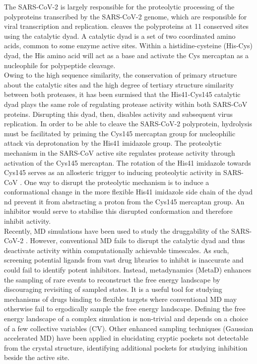 The SARS-CoV-2  is largely responsible for the proteolytic processing of the polyproteins transcribed by the SARS-CoV-2 genome, which are responsible for viral transcription and replication.  cleaves the polyproteins at 11 conserved sites using the catalytic dyad.\cite{hegyi2002conservation, jin2020structure} A catalytic dyad is a set of two coordinated amino acids, common to some enzyme active sites. Within a histidine-cysteine (His-Cys) dyad, the His amino acid will act as a base and activate the Cys mercaptan as a nucleophile for polypeptide cleavage. \\

Owing to the high sequence similarity, the conservation of primary structure about the catalytic sites and the high degree of tertiary structure similarity between both proteases, it has been surmised that the His41-Cys145 catalytic dyad plays the same role of regulating protease activity within both SARS-CoV  proteins.\cite{jin2020structure, ullrich2020sars} Disrupting this dyad, then, disables  activity and subsequent virus replication. In order to be able to cleave the SARS-CoV-2 polyprotein, hydrolysis must be facilitated by priming the  Cys145 mercaptan group for nucleophilic attack via deprotonation by the His41 imidazole group. The proteolytic mechanism in the SARS-CoV  active site regulates protease activity through activation of the Cys145 mercaptan. The rotation of the His41 imidazole towards Cys145 serves as an allosteric trigger to inducing proteolytic activity in SARS-CoV . One way to disrupt the proteolytic mechanism is to induce a conformational change in the more flexible His41 imidazole side chain of the dyad nd prevent it from abstracting a proton from the Cys145 mercaptan group. An inhibitor would serve to stabilise this disrupted conformation and therefore inhibit  activity.\\

Recently, MD simulations have been used to study the druggability of the SARS-CoV-2 \!\!.\cite{macchiagodena2020identification, ghahremanpour2020identification} However, conventional MD fails to disrupt the  catalytic dyad and thus deactivate  activity within computationally achievable timescales. As such, screening potential ligands from vast drug libraries to inhibit  is inaccurate and could fail to identify potent inhibitors. Instead, metadynamics (MetaD) enhances the sampling of rare events to reconstruct the free energy landscape by discouraging revisiting of sampled states. It is a useful tool for studying mechanisms of drugs binding to flexible targets where conventional MD may otherwise fail to ergodically sample the free energy landscape. Defining the free energy landscape of a complex simulation is non-trivial and depends on a choice of a few collective variables (CV).\cite{laio2008metadynamics} Other enhanced sampling techniques (Gaussian accelerated MD\cite{gamd}) have been applied in elucidating cryptic pockets not detectable from the  crystal structure, identifying additional pockets for studying  inhibition beside the active site.\cite{sztain2020elucidation}\\


